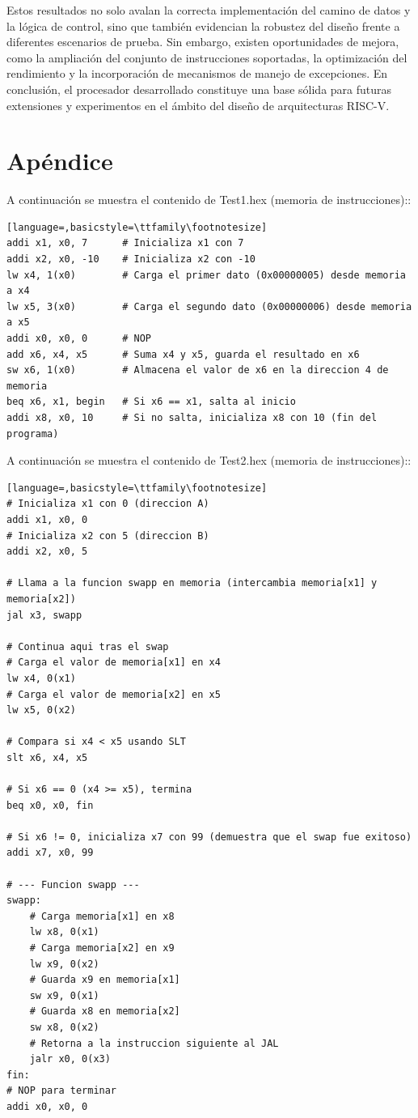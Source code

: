 \documentclass[conference]{IEEEtran}
\begin{document}
Estos resultados no solo avalan la correcta implementación del camino de datos y la lógica de control, sino que también evidencian la robustez del diseño frente a diferentes escenarios de prueba. Sin embargo, existen oportunidades de mejora, como la ampliación del conjunto de instrucciones soportadas, la optimización del rendimiento y la incorporación de mecanismos de manejo de excepciones. En conclusión, el procesador desarrollado constituye una base sólida para futuras extensiones y experimentos en el ámbito del diseño de arquitecturas RISC-V.

\onecolumn
\section*{Apéndice}

A continuación se muestra el contenido de Test1.hex (memoria de instrucciones)::

\begin{lstlisting}[language=,basicstyle=\ttfamily\footnotesize]
addi x1, x0, 7      # Inicializa x1 con 7
addi x2, x0, -10    # Inicializa x2 con -10
lw x4, 1(x0)        # Carga el primer dato (0x00000005) desde memoria a x4
lw x5, 3(x0)        # Carga el segundo dato (0x00000006) desde memoria a x5
addi x0, x0, 0      # NOP
add x6, x4, x5      # Suma x4 y x5, guarda el resultado en x6
sw x6, 1(x0)        # Almacena el valor de x6 en la direccion 4 de memoria
beq x6, x1, begin   # Si x6 == x1, salta al inicio
addi x8, x0, 10     # Si no salta, inicializa x8 con 10 (fin del programa)
\end{lstlisting}

A continuación se muestra el contenido de Test2.hex (memoria de instrucciones)::

\begin{lstlisting}[language=,basicstyle=\ttfamily\footnotesize]
# Inicializa x1 con 0 (direccion A)
addi x1, x0, 0
# Inicializa x2 con 5 (direccion B)
addi x2, x0, 5

# Llama a la funcion swapp en memoria (intercambia memoria[x1] y memoria[x2])
jal x3, swapp

# Continua aqui tras el swap
# Carga el valor de memoria[x1] en x4
lw x4, 0(x1)
# Carga el valor de memoria[x2] en x5
lw x5, 0(x2)

# Compara si x4 < x5 usando SLT
slt x6, x4, x5

# Si x6 == 0 (x4 >= x5), termina
beq x0, x0, fin

# Si x6 != 0, inicializa x7 con 99 (demuestra que el swap fue exitoso)
addi x7, x0, 99

# --- Funcion swapp ---
swapp:
    # Carga memoria[x1] en x8
    lw x8, 0(x1)
    # Carga memoria[x2] en x9
    lw x9, 0(x2)
    # Guarda x9 en memoria[x1]
    sw x9, 0(x1)
    # Guarda x8 en memoria[x2]
    sw x8, 0(x2)
    # Retorna a la instruccion siguiente al JAL
    jalr x0, 0(x3)
fin:
# NOP para terminar
addi x0, x0, 0
\end{lstlisting}
\end{document}
